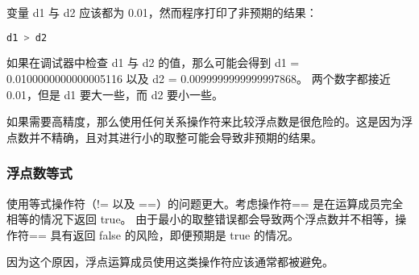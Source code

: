 \documentclass[../../LearnCpp.tex]{subfiles}
\begin{document}
变量 d1 与 d2 应该都为 0.01，然而程序打印了非预期的结果：

\begin{lstlisting}[language=C++]
d1 > d2
\end{lstlisting}

如果在调试器中检查 d1 与 d2 的值，那么可能会得到 d1 = 0.0100000000000005116 以及 d2 = 0.0099999999999997868。
两个数字都接近 0.01，但是 d1 要大一些，而 d2 要小一些。

如果需要高精度，那么使用任何关系操作符来比较浮点数是很危险的。这是因为浮点数并不精确，且对其进行小的取整可能会导致非预期的结果。

\subsubsection*{浮点数等式}

使用等式操作符（!= 以及 ==）的问题更大。考虑操作符== 是在运算成员完全相等的情况下返回 true。
由于最小的取整错误都会导致两个浮点数并不相等，操作符== 具有返回 false 的风险，即便预期是 true 的情况。

因为这个原因，浮点运算成员使用这类操作符应该通常都被避免。
\end{document}
